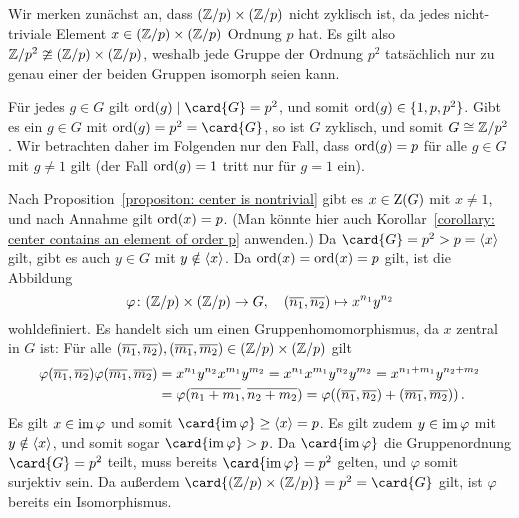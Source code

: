 \subsection{}

Wir merken zunächst an, dass $(\mathbb{Z}/p) \times (\mathbb{Z}/p)$ nicht zyklisch ist, da jedes nicht-triviale Element $x \in (\mathbb{Z}/p) \times (\mathbb{Z}/p)$ Ordnung $p$ hat.
Es gilt also $\mathbb{Z}/p^2 \ncong (\mathbb{Z}/p) \times (\mathbb{Z}/p)$, weshalb jede Gruppe der Ordnung $p^2$ tatsächlich nur zu genau einer der beiden Gruppen isomorph seien kann.

Für jedes $g \in G$ gilt $\ord{g} \divides \card{G} = p^2$, und somit $\operatorname{ord}(g) \in \{1, p, p^2\}$.
Gibt es ein $g \in G$ mit $\ord{g} = p^2 = \card{G}$, so ist $G$ zyklisch, und somit $G \cong \mathbb{Z}/p^2$.
Wir betrachten daher im Folgenden nur den Fall, dass $\operatorname{ord}(g) = p$ für alle $g \in G$ mit $g \neq 1$ gilt (der Fall $\operatorname{ord}(g) = 1$ tritt nur für $g = 1$ ein).

Nach Proposition~\ref{propositon: center is nontrivial} gibt es $x \in \operatorname{Z}(G)$ mit $x \neq 1$, und nach Annahme gilt $\operatorname{ord}(x) = p$.
(Man könnte hier auch Korollar~\ref{corollary: center contains an element of order p} anwenden.)
Da $\card{G} = p^2 > p = \generated{x}$ gilt, gibt es auch $y \in G$ mit $y \notin \langle x\rangle$.
Da $\operatorname{ord}(x) = \operatorname{ord}(x) = p$ gilt, ist die Abbildung
\[
          \varphi
  \colon  (\mathbb{Z}/p) \times (\mathbb{Z}/p)
  \to     G,
  \quad   (\overline{n_1}, \overline{n_2})
  \mapsto x^{n_1} y^{n_2}
\]
wohldefiniert.
Es handelt sich um einen Gruppenhomomorphismus, da $x$ zentral in $G$ ist:
Für alle $(\overline{n_1}, \overline{n_2}), (\overline{m_1}, \overline{m_2}) \in (\mathbb{Z}/p) \times (\mathbb{Z}/p)$ gilt
\begin{align*}
      \varphi(\overline{n_1}, \overline{n_2}) \varphi(\overline{m_1}, \overline{m_2})
  &=  x^{n_1} y^{n_2} x^{m_1} y^{m_2}
   =  x^{n_1} x^{m_1} y^{n_2} y^{m_2}
   =  x^{n_1 + m_1} y^{n_2 + m_2}
  \\
  &=  \varphi(\overline{n_1 + m_1}, \overline{n_2 + m_2})
   =  \varphi( (\overline{n_1}, \overline{n_2}) + (\overline{m_1}, \overline{m_2}) )\,.
\end{align*}
Es gilt $x \in \operatorname{im} \varphi$ und somit $\card{\im \varphi} \geq \generated{x} = p$.
Es gilt zudem $y \in \operatorname{im} \varphi$ mit $y \notin \langle x\rangle$, und somit sogar $\card{\im \varphi} > p$.
Da $\card{\im \varphi}$ die Gruppenordnung $\card{G} = p^2$ teilt, muss bereits $\card{\im \varphi} = p^2$ gelten, und $\varphi$ somit surjektiv sein.
Da außerdem $\card{(\Integer/p) \times (\Integer/p)} = p^2 = \card{G}$ gilt, ist $\varphi$ bereits ein Isomorphismus.

